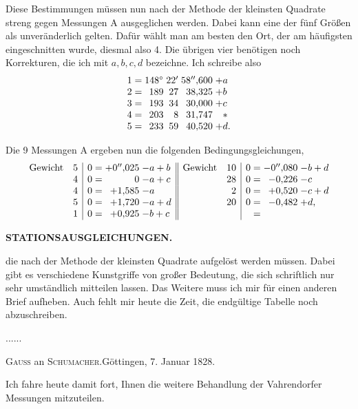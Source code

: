 Diese Bestimmungen müssen nun nach der Methode der kleinsten Quadrate streng gegen  Messungen A ausgeglichen werden. Dabei kann eine der fünf Größen als unveränderlich gelten. Dafür wählt man am besten den Ort, der am häufigsten eingeschnitten wurde, diesmal also 4. Die übrigen vier benötigen noch Korrekturen, die ich mit \(a,b,c,d\) bezeichne. Ich schreibe also
\[
\begin{array}{@{}r@{\;=\;}r@{\;}r@{\;}r@{\;}l@{}}
 1&148^\circ&22'&58''{,}600&+a\\
 2&189&27&38{,}325&+b\\
 3&193&34&30{,}000&+c\\
 4&203&8&31{,}747&\phantom{+}*\\
 5&233&59&40{,}520&+d.
\end{array}
\]

Die 9 Messungen A ergeben nun die folgenden Bedingungsgleichungen,
\[
\begin{array}{@{}lr|r@{\;=\;}r@{\;}l||lr|r@{\;=\;}r@{\;}l@{}}
 \text{Gewicht}&5&0&+0''{,}025&-a+b&
 \text{Gewicht}&10&0&-0''{,}080&-b+d\\
 &4&0&0&-a+c&&28&0&-0{,}226&-c\\
 &4&0&+1{,}585&-a&&2&0&+0{,}520&-c+d\\
 &5&0&+1{,}720&-a+d&&20&0&-0{,}482&+d,\\
 &1&0&+0{,}925&-b+c&&&&&
\end{array}
\]

\par\clearpage
\noindent\null\hfill{\small\textbf{STATIONSAUSGLEICHUNGEN.}}\hfill{}\par\medskip

\noindent die nach der Methode der kleinsten Quadrate aufgelöst werden müssen. Dabei gibt es verschiedene Kunstgriffe von großer Bedeutung, die sich schriftlich nur sehr umständlich mitteilen lassen. Das Weitere muss ich mir für einen anderen Brief aufheben. Auch fehlt mir heute die Zeit, die endgültige Tabelle noch abzuschreiben.

.\enspace.\enspace.\enspace.\enspace.\enspace.

\vspace{1.4cm}
\begin{center}
 \textsc{Gauss} an \textsc{Schumacher}.\quad Göttingen, 7. Januar 1828.
\end{center}

Ich fahre heute damit fort, Ihnen die weitere Behandlung der Vahrendorfer Messungen mitzuteilen.

